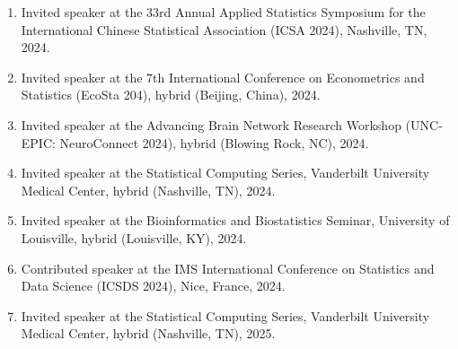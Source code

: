 \documentclass[12pt]{article}
\begin{document}
\begin{enumerate}
		\item Invited speaker at the 33rd Annual Applied Statistics 
		Symposium for the International Chinese Statistical 
		Association (ICSA 2024), Nashville, TN, 2024.
		
		\item Invited speaker at the 7th International Conference on 
		Econometrics and Statistics (EcoSta 204), hybrid (Beijing, 
		China), 2024.
		
		\item Invited speaker at the Advancing Brain Network 
		Research Workshop (UNC-EPIC: NeuroConnect 2024), hybrid 
		(Blowing Rock, NC), 2024.
		
		\item Invited speaker at the Statistical Computing Series, 
		Vanderbilt University Medical Center, hybrid (Nashville, 
		TN), 2024. 
		
		\item Invited speaker at the Bioinformatics and 
		Biostatistics Seminar, University of Louisville, hybrid 
		(Louisville, KY), 2024.
		
		\item Contributed speaker at the IMS International 
		Conference on Statistics and Data Science (ICSDS 2024), 
		Nice, France, 2024.
		
		\item Invited speaker at the Statistical Computing Series, 
		Vanderbilt University Medical Center, hybrid (Nashville, 
		TN), 2025. 	
	\end{enumerate}
	
\end{document}
